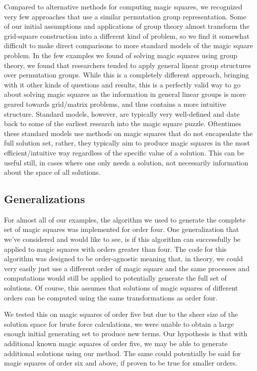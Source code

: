 \documentclass{rhumj_new}
\begin{document}
Compared to alternative methods for computing magic squares, we recognized very few approaches
that use a similar permutation group representation. Some of our initial assumptions and
applications of group theory almost transform the grid-square construction into a different kind of
problem, so we find it somewhat difficult to make direct comparisons to more standard models of the
magic square problem. In the few examples we found of solving magic squares using group theory, we
found that researchers tended to apply general linear group structures over permutation groups.
While this is a completely different approach, bringing with it other kinds of questions and
results, this is a perfectly valid way to go about solving magic squares as the information in
general linear groups is more geared towards grid/matrix problems, and thus contains a more
intuitive structure. Standard models, however, are typically very well-defined and date back to
some of the earliest research into the magic square puzzle. Oftentimes these standard models use
methods on magic squares that do not encapsulate the full solution set, rather, they typically aim
to produce magic squares in the most efficient/intuitive way regardless of the specific value of a
solution. This can be useful still, in cases where one only needs a solution, not necessarily
information about the space of all solutions.

\subsection{Generalizations}

For almost all of our examples, the algorithm we used to generate the complete set of magic
squares was implemented for order four. One generalization that we've considered and would like to
see, is if this algorithm can successfully be applied to magic squares with orders greater than
four. The code for this algorithm was designed to be order-agnostic meaning that, in theory, we
could very easily just use a different order of magic square and the same processes and
computations would still be applied to potentially generate the full set of solutions. Of course,
this assumes that solutions of magic squares of different orders can be computed using the same
transformations as order four.

We tested this on magic squares of order five but due to the sheer size of the solution space
for brute force calculations, we were unable to obtain a large enough initial generating set to
produce new terms. Our hypothesis is that with additional known magic squares of order five, we may
be able to generate additional solutions using our method. The same could potentially be said for
magic squares of order six and above, if proven to be true for smaller orders.
\end{document}

